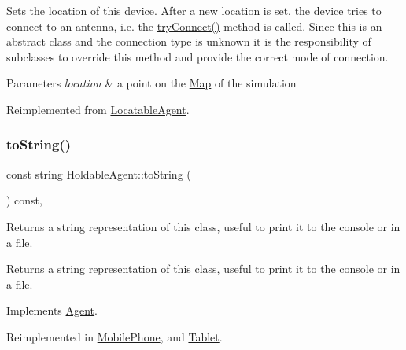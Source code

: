 Sets the location of this device. After a new location is set, the device tries to connect to an antenna, i.\+e. the \hyperlink{class_holdable_agent_a0789d757d81b43ee016e9362046f6dea}{try\+Connect()} method is called. Since this is an abstract class and the connection type is unknown it is the responsibility of subclasses to override this method and provide the correct mode of connection. 
\begin{DoxyParams}{Parameters}
{\em location} & a point on the \hyperlink{class_map}{Map} of the simulation \\
\hline
\end{DoxyParams}


Reimplemented from \hyperlink{class_locatable_agent_a754b237c404b77714fedd397f214bc02}{Locatable\+Agent}.

\mbox{\label{class_holdable_agent_a2c581226b8994f24b6b2306ae17dbb52}} 
\subsubsection{\texorpdfstring{to\+String()}{toString()}}
{\footnotesize\ttfamily const string Holdable\+Agent\+::to\+String (\begin{DoxyParamCaption}{ }\end{DoxyParamCaption}) const\hspace{0.3cm}{\ttfamily [override]}, {\ttfamily [virtual]}}

Returns a string representation of this class, useful to print it to the console or in a file. \begin{DoxyReturn}{Returns}
a string representation of this class, useful to print it to the console or in a file. 
\end{DoxyReturn}


Implements \hyperlink{class_agent_a44f291596d10c7878b0641d6ec156328}{Agent}.



Reimplemented in \hyperlink{class_mobile_phone_a2b7e556d12a43e380786ad0eccf3ce04}{Mobile\+Phone}, and \hyperlink{class_tablet_a3fae01e7d526699476221c6a686a4fba}{Tablet}.

\mbox{\label{class_holdable_agent_a0789d757d81b43ee016e9362046f6dea}} 
